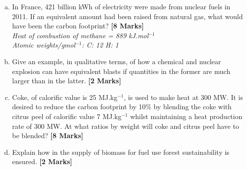 \documentclass[calculator,steamtables]{exam}
\begin{document}
\clearpage

\begin{question} \vspace{-2\baselineskip}
\begin{enumerate}[(a)]
\item In France, 421 billion kWh of electricity were made from nuclear fuels in 2011.  If an equivalent amount had been raised from natural gas, what would have been the carbon footprint? {\bf [8 Marks]}\\
{\it Heat of combustion of methane = 889 kJ.mol$^{-1}$ \\
Atomic weights/gmol$^{-1}$: C: 12 \;\; H: 1}
\item Give an example, in qualitative terms, of how a chemical and nuclear explosion can have equivalent blasts if quantities in the former are much larger than in the latter. {\bf [2 Marks]}
\item Coke, of calorific value is 25 MJ.kg$^{-1}$, is used to make heat at 300 MW. It is desired to reduce the carbon footprint by 10$\%$ by blending the coke with citrus peel of calorific value 7 MJ.kg$^{-1}$ whilst maintaining a heat production rate of 300 MW. At what ratios by weight will coke and citrus peel have to be blended? {\bf [8 Marks]}
\item Explain how in the supply of biomass for fuel use forest sustainability is ensured. {\bf [2 Marks]}
\end{enumerate} 

\end{question}

\clearpage
\end{document}
